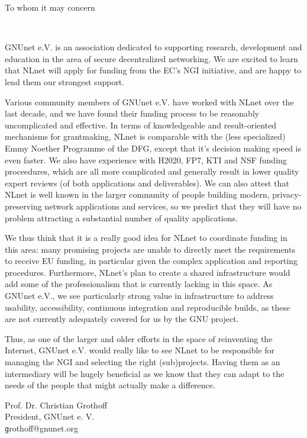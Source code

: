 \documentclass[DIN, pagenumber=false, parskip=half,
               fromalign=right, fromphone=false, fromfax=false, frombank=true,
               yourmail=false,
               yourref=false,
               fromrule=false]{scrlttr2}
\begin{document}
\begin{letter}{
        To whom it may concern \\
}

\opening{\ }
\vspace{-1.5cm}


GNUnet e.V. is an association dedicated to supporting research,
development and education in the area of secure decentralized
networking.  We are excited to learn that NLnet will apply for funding
from the EC's NGI initiative, and are happy to lend them our strongest
support.

Various community members of GNUnet e.V. have worked with NLnet over
the last decade, and we have found their funding process to be
reasonably uncomplicated and effective.  In terms of knowledgeable and
result-oriented mechanisms for grantmaking, NLnet is comparable with
the (less specialized) Emmy Noether Programme of the DFG, except that
it's decision making speed is even faster.  We also have experience
with H2020, FP7, KTI and NSF funding proceedures, which are all more
complicated and generally result in lower quality expert reviews (of
both applications and deliverables).  We can also attest that NLnet is
well known in the larger community of people building modern,
privacy-preserving network applications and services, so we predict
that they will have no problem attracting a substantial number of
quality applications.

We thus think that it is a really good idea for NLnet to coordinate
funding in this area: many promising projects are unable to directly
meet the requirements to receive EU funding, in particular given the
complex application and reporting procedures.  Furthermore, NLnet's
plan to create a shared infrastructure would add some of the
professionalism that is currently lacking in this space.  As GNUnet
e.V., we see particularly strong value in infrastructure to address
usability, accessibility, continuous integration and reproducible
builds, as these are not currently adequately covered for us by the
GNU project.

Thus, as one of the larger and older efforts in the space of
reinventing the Internet, GNUnet e.V. would really like to see NLnet
to be responsible for managing the NGI and selecting the right
(sub)projects.  Having them as an intermediary will be hugely
beneficial as we know that they can adapt to the needs of the
people that might actually make a difference.


\vspace{3cm}
Prof. Dr. Christian Grothoff\\
President, GNUnet e. V. \\
{\texttt grothoff@gnunet.org}


\end{letter}
\end{document}
